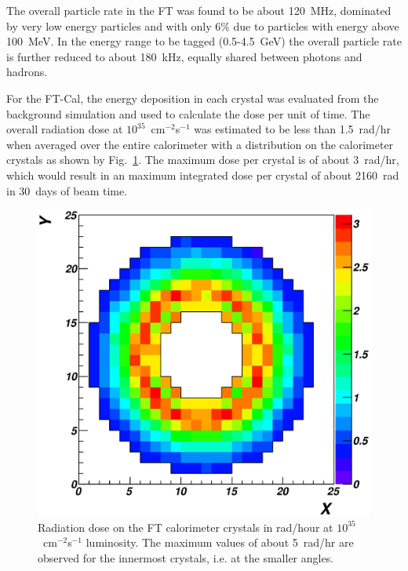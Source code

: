 The overall particle rate in the FT was found to be about 120~MHz, dominated by very low energy particles and with
only 6\% due to particles with energy above 100~MeV. In the energy range to be tagged (0.5-4.5~GeV) the overall
particle rate is further reduced to about 180~kHz, equally shared between photons and hadrons. 

For the FT-Cal, the energy deposition in each crystal was evaluated from the background simulation and used to
calculate the dose per unit of time. The overall radiation dose at $10^{35}$~cm$^{-2}$s$^{-1}$ was estimated to be
less than 1.5~rad/hr when averaged over the entire calorimeter with a distribution on the calorimeter crystals as
shown by Fig.~\ref{fig:ft_rad}. The maximum dose per crystal is of about 3~rad/hr, which would result in an
maximum integrated dose per crystal of about 2160~rad in 30~days of beam time.

\begin{figure}
\includegraphics[height=\columnwidth]{fig/ft_rad.eps}
\caption{Radiation dose on the FT calorimeter crystals in rad/hour at $10^{35}$~cm$^{-2}$s$^{-1}$ luminosity. The
  maximum values of about 5~rad/hr are observed for the innermost crystals, i.e. at the smaller angles.}
\label{fig:ft_rad}
\end{figure}
